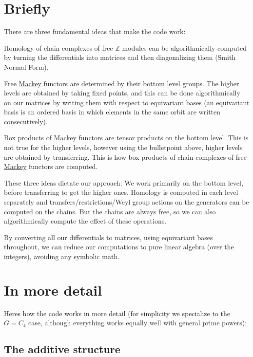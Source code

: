 \hypertarget{math_Briefly}{}\section{Briefly}\label{math_Briefly}
There are three fundamental ideas that make the code work\+:


\begin{DoxyItemize}
\item Homology of chain complexes of free $\mathbb Z$ modules can be algorithmically computed by turning the differentials into matrices and then diagonalizing them (Smith Normal Form).
\item Free \hyperlink{namespaceMackey}{Mackey} functors are determined by their bottom level groups. The higher levels are obtained by taking fixed points, and this can be done algorithmically on our matrices by writing them with respect to equivariant bases (an equivariant basis is an ordered basis in which elements in the same orbit are written consecutively).
\item Box products of \hyperlink{namespaceMackey}{Mackey} functors are tensor products on the bottom level. This is not true for the higher levels, however using the bulletpoint above, higher levels are obtained by transferring. This is how box products of chain complexes of free \hyperlink{namespaceMackey}{Mackey} functors are computed.
\end{DoxyItemize}

These three ideas dictate our approach\+: We work primarily on the bottom level, before transferring to get the higher ones. Homology is computed in each level separately and transfers/restrictions/\+Weyl group actions on the generators can be computed on the chains. But the chains are always free, so we can also algorithmically compute the effect of these operations.

By converting all our differentials to matrices, using equivariant bases throughout, we can reduce our computations to pure linear algebra (over the integers), avoiding any symbolic math.\hypertarget{math_imd}{}\section{In more detail}\label{math_imd}
Here\textquotesingle{}s how the code works in more detail (for simplicity we specialize to the $G=C_4$ case, although everything works equally well with general prime powers)\+:\hypertarget{math_add}{}\subsection{The additive structure}\label{math_add}

